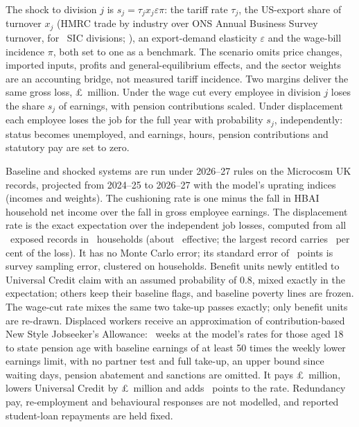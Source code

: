  The shock to division $j$ is
$s_j=\tau_j x_j \varepsilon \pi$: the tariff rate $\tau_j$, the
US-export share of turnover $x_j$ (HMRC trade by industry over ONS
Annual Business Survey turnover, for \EThreeIndDivisions\ SIC
divisions; \citealp{hmrctrade, onsabs}), an export-demand elasticity
$\varepsilon$ and the wage-bill incidence $\pi$, both set to one as a
benchmark. The scenario omits price changes, imported inputs, profits
and general-equilibrium effects, and the sector weights are an
accounting bridge, not measured tariff incidence. Two margins deliver
the same gross loss, \pounds\EThreeDispGrossM\ million. Under the wage
cut every employee in division $j$ loses the share $s_j$ of earnings,
with pension contributions scaled. Under displacement each employee
loses the job for the full year with probability $s_j$,
independently: status becomes unemployed, and earnings, hours, pension
contributions and statutory pay are set to zero.

 Baseline and shocked systems are run under
2026--27 rules on the Microcosm UK records, projected from 2024--25 to
2026--27 with the model's uprating indices (incomes and weights). The
cushioning rate is one minus the fall in HBAI household net income
over the fall in gross employee earnings. The displacement rate is the
exact expectation over the independent job losses, computed from all
\EThreeDispExposedRecords\ exposed records in
\EThreeDispExposedHouseholds\ households (about
\EThreeDispExactEffRecords\ effective; the largest record carries
\EThreeDispExactMaxShare\ per cent of the loss). It has no Monte Carlo
error; its standard error of \EThreeDispSamplingSe\ points is survey
sampling error, clustered on households. Benefit units newly entitled
to Universal Credit claim with an assumed probability of 0.8, mixed
exactly in the expectation; others keep their baseline flags, and
baseline poverty lines are frozen. The wage-cut rate mixes the same
two take-up passes exactly; only \numword{\EThreeWageRedrawnUnits} benefit
units are re-drawn. Displaced workers receive an approximation of
contribution-based New Style Jobseeker's Allowance:
\EThreeDispJsaWeeks\ weeks at the model's rates for those aged 18 to
state pension age with baseline earnings of at least 50 times the
weekly lower earnings limit, with no partner test and full take-up, an
upper bound since waiting days, pension abatement and sanctions are
omitted. It pays \pounds\EThreeDispJsaPaidM\ million, lowers Universal
Credit by \pounds\EThreeDispJsaUcOffsetM\ million and adds
\EThreeDispJsaEffectPts\ points to the rate. Redundancy pay,
re-employment and behavioural responses are not modelled, and reported
student-loan repayments are held fixed.

